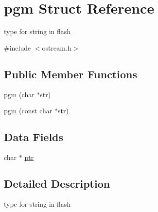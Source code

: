 \hypertarget{structpgm}{\section{pgm Struct Reference}
\label{structpgm}
}


type for string in flash  




{\ttfamily \#include $<$ostream.\-h$>$}

\subsection*{Public Member Functions}
\begin{DoxyCompactItemize}
\item 
\hyperlink{structpgm_a3568c57c513114862f430e96d49cf11b}{pgm} (char $\ast$str)
\item 
\hyperlink{structpgm_a91724be6016dc4ec3a1b33d81bf419e1}{pgm} (const char $\ast$str)
\end{DoxyCompactItemize}
\subsection*{Data Fields}
\begin{DoxyCompactItemize}
\item 
char $\ast$ \hyperlink{structpgm_a935adc2e417a61d7eb6f04efb18ba031}{ptr}
\end{DoxyCompactItemize}


\subsection{Detailed Description}
type for string in flash 

